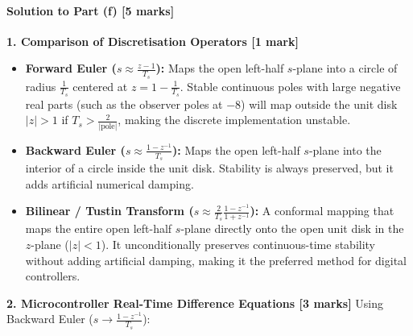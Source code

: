 \documentclass[12pt,onecolumn,twoside ]{article}
\begin{document}
	\paragraph{Solution to Part (f) [5 marks]}
	\textbf{1. Comparison of Discretisation Operators [1 mark]}
	\begin{itemize}
		\item
		\textbf{Forward Euler ($s \approx \frac{z - 1}{T_s}$):} Maps the open left-half $s$-plane into a circle of radius $\frac{1}{T_s}$ centered at $z = 1 - \frac{1}{T_s}$. Stable continuous poles with large negative real parts (such as the observer poles at $-8$) will map outside the unit disk $|z| > 1$ if $T_s > \frac{2}{|\text{pole}|}$, making the discrete implementation unstable.
		\item
		\textbf{Backward Euler ($s \approx \frac{1 - z^{-1}}{T_s}$):} Maps the open left-half $s$-plane into the interior of a circle inside the unit disk. Stability is always preserved, but it adds artificial numerical damping.
		\item
		\textbf{Bilinear / Tustin Transform ($s \approx \frac{2}{T_s} \frac{1 - z^{-1}}{1 + z^{-1}}$):} A conformal mapping that maps the entire open left-half $s$-plane directly onto the open unit disk in the $z$-plane ($|z| < 1$). It unconditionally preserves continuous-time stability without adding artificial damping, making it the preferred method for digital controllers.
	\end{itemize}
	\textbf{2. Microcontroller Real-Time Difference Equations [3 marks]} Using Backward Euler ($s \to \frac{1 - z^{-1}}{T_s}$):
\end{document}
